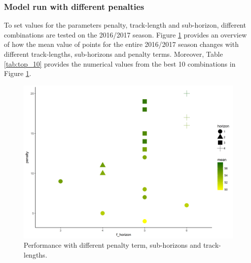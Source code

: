 \subsubsection{Model run with different penalties}

To set values for the parameters penalty, track-length and sub-horizon, different combinations are tested on the 2016/2017 season. Figure \ref{Parameter_choice} provides an overview of how the mean value of points for the entire 2016/2017 season changes with different track-lengths, sub-horizons and penalty terms. Moreover, Table \ref{tab:top_10} provides the numerical values from the best 10 combinations in Figure \ref{Parameter_choice}.


\newpar

\begin{figure}[H]
    \centering
    \includegraphics[scale=0.45]{fig/chapter_6/paramter_choice.png}
    \caption{Performance with different penalty term, sub-horizons and track-lengths.}
\label{Parameter_choice}    
\end{figure}

